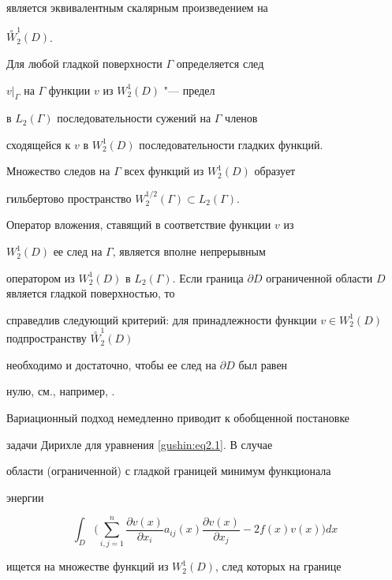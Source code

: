 является эквивалентным скалярным произведением на

${\stackrel{\circ}{W}_2^1(D)}$.



Для любой гладкой поверхности $\Gamma$ определяется след

$v|_{\Gamma}$ на $\Gamma$ функции $v$ из $W_2^1(D)$ "--- предел

в $L_2(\Gamma)$ последовательности сужений на $\Gamma$ членов

сходящейся к $v$ в $W_2^1(D)$ последовательности гладких функций.

Множество следов на $\Gamma$ всех функций из $W_2^1(D)$ образует

гильбертово пространство $W^{1/2}_2(\Gamma) \subset L_2(\Gamma)$.

Оператор вложения, ставящий в соответствие функции $v$ из

$W_2^1(D)$ ее след на $\Gamma$, является вполне непрерывным

оператором из $W_2^1(D)$ в $L_2(\Gamma)$. Если граница $\partial

D$ ограниченной области $D$ является гладкой поверхностью, то

справедлив следующий критерий:  для принадлежности функции $v\in

W_2^1(D)$ подпространству ${\stackrel{\circ}{W}_2^1(D)}$

необходимо и достаточно, чтобы ее след на $\partial D$ был равен

нулю, см., например, \cite{gushin:Mih}.



Вариационный подход  немедленно приводит к обобщенной постановке

задачи Дирихле для уравнения \eqref{gushin:eq2.1}. В случае

области (ограниченной) с гладкой границей минимум функционала

энергии

\begin{equation}

\label{gushin:eq2.4} \int _D \biggl(\sum_{i,j=1}^n

\frac{\partial v(x)}{\partial x_i}a_{ij}(x)\frac{\partial

v(x)}{\partial x_j} - 2 f(x) v(x) \biggr) dx

\end{equation}

ищется на множестве функций из $W_2^1(D)$, след которых на границе

